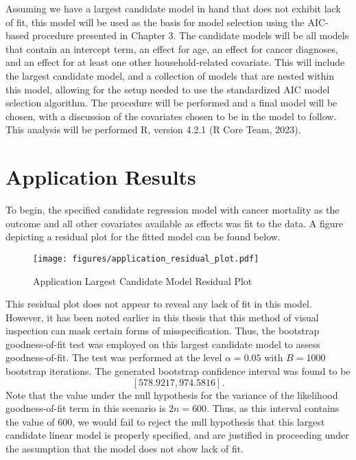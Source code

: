 		Assuming we have a largest candidate model in hand that does not exhibit lack of fit, this model will be used as the basis for model selection using the
		AIC-based procedure presented in Chapter 3. The candidate models will be all models that contain an intercept term, an effect for age, an effect for cancer
		diagnoses, and an effect for at least one other household-related covariate. This will include the largest candidate model, and a collection of models that
		are nested within this model, allowing for the setup needed to use the standardized AIC model selection algorithm. The procedure will be performed and a final model
		will be chosen, with a discussion of the covariates chosen to be in the model to follow. This analysis will be performed R, version 4.2.1 (R Core Team, 2023).
		
		\section{Application Results} \label{sec:app_res}

		To begin, the specified candidate regression model with cancer mortality as the outcome and all other covariates available as effects was fit to the data. A
		figure depicting a residual plot for the fitted model can be found below.

		\begin{figure}[H]
			\centering
			\captionsetup{justification=centering}
			\texttt{[image: figures/application\_residual\_plot.pdf]}
			\caption{\label{fig:app_residual_plot} Application Largest Candidate Model Residual Plot}
		\end{figure}

		This residual plot does not appear to reveal any lack of fit in this model. However, it has been noted earlier in this thesis that this method of visual
		inspection can mask certain forms of misspecification. Thus, the bootstrap goodness-of-fit test was employed on this largest candidate model to assess
		goodness-of-fit. The test was performed at the level $\alpha = 0.05$ with $B = 1000$ bootstrap iterations. The generated bootstrap confidence interval
		was found to be
		\begin{equation}
			\left[ 578.9217, 974.5816 \right].
		\end{equation}
		Note that the value under the null hypothesis for the variance of the likelihood goodness-of-fit term in this scenario is $2n = 600$. Thus, as this interval contains the
		value of $600$, we would fail to reject the null hypothesis that this largest candidate linear model is properly specified, and are justified in proceeding
		under the assumption that the model does not show lack of fit.

